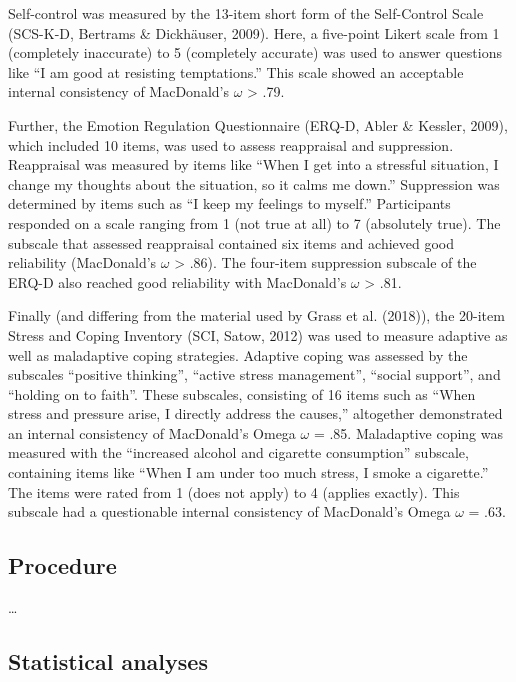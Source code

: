\documentclass[
  man]{apa6}
\begin{document}
Self-control was measured by the 13-item short form of the Self-Control Scale (SCS-K-D, Bertrams \& Dickhäuser, 2009).
Here, a five-point Likert scale from 1 (completely inaccurate) to 5 (completely accurate) was used to answer questions like ``I am good at resisting temptations.''
This scale showed an acceptable internal consistency of MacDonald's \(\omega\) \textgreater{} .79.

Further, the Emotion Regulation Questionnaire (ERQ-D, Abler \& Kessler, 2009), which included 10 items, was used to assess reappraisal and suppression. Reappraisal was measured by items like ``When I get into a stressful situation, I change my thoughts about the situation, so it calms me down.''
Suppression was determined by items such as ``I keep my feelings to myself.''
Participants responded on a scale ranging from 1 (not true at all) to 7 (absolutely true).
The subscale that assessed reappraisal contained six items and achieved good reliability (MacDonald's \(\omega\) \textgreater{} .86).
The four-item suppression subscale of the ERQ-D also reached good reliability with MacDonald's \(\omega\) \textgreater{} .81.

Finally (and differing from the material used by Grass et al. (2018)), the 20-item Stress and Coping Inventory (SCI, Satow, 2012) was used to measure adaptive as well as maladaptive coping strategies.
Adaptive coping was assessed by the subscales ``positive thinking'', ``active stress management'', ``social support'', and ``holding on to faith''.
These subscales, consisting of 16 items such as ``When stress and pressure arise, I directly address the causes,'' altogether demonstrated an internal consistency of MacDonald's Omega \(\omega\) = .85.
Maladaptive coping was measured with the ``increased alcohol and cigarette consumption'' subscale, containing items like ``When I am under too much stress, I smoke a cigarette.'' The items were rated from 1 (does not apply) to 4 (applies exactly).
This subscale had a questionable internal consistency of MacDonald's Omega \(\omega\) = .63.

\subsection{Procedure}\label{procedure}

\ldots{}

\subsection{Statistical analyses}\label{statistical-analyses}
\end{document}
